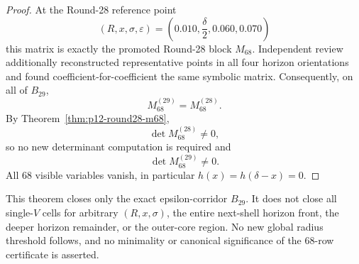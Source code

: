 \begin{proof}
At the Round-28 reference point
\[
(R,x,\sigma,\varepsilon)
=
\left(0.010,\frac\delta2,0.060,0.070\right)
\]
this matrix is exactly the promoted Round-28 block \(M_{68}\).  Independent
review additionally reconstructed representative points in all four horizon
orientations and found coefficient-for-coefficient the same symbolic matrix.
Consequently, on all of \(B_{29}\),
\[
M_{68}^{(29)}=M_{68}^{(28)}.
\]
By Theorem~\ref{thm:p12-round28-m68},
\[
\det M_{68}^{(28)}\ne0,
\]
so no new determinant computation is required and
\[
\det M_{68}^{(29)}\ne0.
\]
All 68 visible variables vanish, in particular
\(h(x)=h(\delta-x)=0\).
\end{proof}

\begin{remark}
\label{rem:p12-round29-scope}
This theorem closes only the exact epsilon-corridor \(B_{29}\).  It does not
close all single-\(V\) cells for arbitrary \((R,x,\sigma)\), the entire
next-shell horizon front, the deeper horizon remainder, or the outer-core
region.  No new global radius threshold follows, and no minimality or
canonical significance of the 68-row certificate is asserted.
\end{remark}
